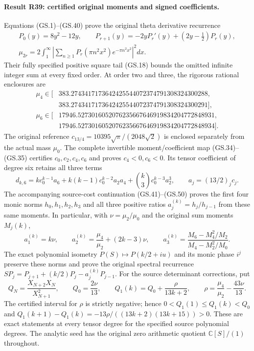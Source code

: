 \paragraph{Result R39: certified original moments and signed coefficients.}
Equations (GS.1)--(GS.40) prove the original theta derivative recurrence
\begin{gather*}
 P_0(y)=8y^2-12y,\qquad
 P_{r+1}(y)=-2yP_r'(y)+(2y-\tfrac12)P_r(y),\\
 \mu_{2r}=2\int_1^\infty
 \left|\sum_{n\ge1}P_r(\pi n^2x^2)e^{-\pi n^2x^2}\right|^2dx.
\end{gather*}
Their fully specified positive square tail (GS.18) bounds the
omitted infinite integer sum at every fixed order. At order two
and three, the rigorous rational enclosures are
\begin{align*}
 \mu_4\in[&383.2743417173642425544072374791308324300288,\\
          &383.2743417173642425544072374791308324300291],\\
 \mu_6\in[&17946.5273016052076235667646919834204772848931,\\
          &17946.5273016052076235667646919834204772848934].
\end{align*}
The original reference $c_{13/4}=10395\sqrt\pi/(2048\sqrt2)$ is
enclosed separately from the actual mass $\mu_0$.
The complete invertible moment/coefficient map (GS.34)--(GS.35)
certifies $c_0,c_2,c_4,c_6$ and proves $c_4<0,c_6<0$.
Its tensor coefficient of degree six retains all three terms
\[
 d_{k,6}=k c_0^{k-1}a_6+k(k-1)c_0^{k-2}a_2a_4
                    +\binom{k}{3}c_0^{k-3}a_2^3,
 \qquad a_j=(13/2)_jc_j.
\]
The accompanying source-cost continuation (GS.41)--(GS.50) proves
the first four monic norms $h_0,h_1,h_2,h_3$ and all three positive
ratios $a_j^{(k)}=h_j/h_{j-1}$ from these same moments. In particular,
with $\nu=\mu_2/\mu_0$ and the original sum moments $M_j(k)$,
\[
 a_1^{(k)}=k\nu,\qquad
 a_2^{(k)}=\frac{\mu_4}{\mu_2}+(2k-3)\nu,\qquad
 a_3^{(k)}=\frac{M_6-M_4^2/M_2}{M_4-M_2^2/M_0}.
\]
The exact polynomial isometry $P(S)\mapsto P(k/2+iu)$ and its
monic phase $i^j$ preserve these norms and prove the original
spectral recurrence $SP_j=P_{j+1}+(k/2)P_j-a_j^{(k)}P_{j-1}$.
For the source determinant corrections, put
\[
 Q_N=\frac{X_{N+2}X_N}{X_{N+1}^2},\qquad
 Q_0=\frac{2\nu}{13},\qquad
 Q_1(k)=Q_0+\frac{\rho}{13k+2},\qquad
 \rho=\frac{\mu_4}{\mu_2}-\frac{43\nu}{13}.
\]
The certified interval for $\rho$ is strictly negative; hence
$0<Q_1(1)\le Q_1(k)<Q_0$ and
$Q_1(k+1)-Q_1(k)=-13\rho/((13k+2)(13k+15))>0$.
These are exact statements at every tensor degree for the specified
source polynomial degrees. The analytic seed has the original zero
arithmetic quotient $\mathbb C[S]/(1)$ throughout.

